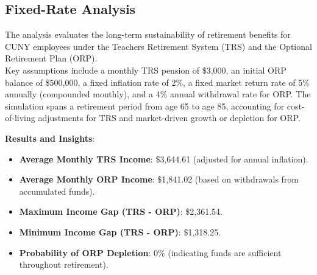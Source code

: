 \documentclass[
  letterpaper,
  DIV=11,
  numbers=noendperiod]{scrartcl}
\newenvironment{Shaded}{\begin{snugshade}}{\end{snugshade}}
\newcommand{\AttributeTok}[1]{\textcolor[rgb]{0.40,0.45,0.13}{#1}}
\newcommand{\CommentTok}[1]{\textcolor[rgb]{0.37,0.37,0.37}{#1}}
\newcommand{\DecValTok}[1]{\textcolor[rgb]{0.68,0.00,0.00}{#1}}
\newcommand{\FunctionTok}[1]{\textcolor[rgb]{0.28,0.35,0.67}{#1}}
\newcommand{\NormalTok}[1]{\textcolor[rgb]{0.00,0.23,0.31}{#1}}
\newcommand{\OtherTok}[1]{\textcolor[rgb]{0.00,0.23,0.31}{#1}}
\newcommand{\SpecialCharTok}[1]{\textcolor[rgb]{0.37,0.37,0.37}{#1}}
\begin{document}
\begin{Shaded}
\end{Shaded}

\subsection{Fixed-Rate Analysis}\label{fixed-rate-analysis}

The analysis evaluates the long-term sustainability of retirement
benefits for CUNY employees under the Teachers Retirement System (TRS)
and the Optional Retirement Plan (ORP).\\
Key assumptions include a monthly TRS pension of \$3,000, an initial ORP
balance of \$500,000, a fixed inflation rate of 2\%, a fixed market
return rate of 5\% annually (compounded monthly), and a 4\% annual
withdrawal rate for ORP. The simulation spans a retirement period from
age 65 to age 85, accounting for cost-of-living adjustments for TRS and
market-driven growth or depletion for ORP.

\textbf{Results and Insights}:

\begin{itemize}
\item
  \textbf{Average Monthly TRS Income}: \$3,644.61 (adjusted for annual
  inflation).
\item
  \textbf{Average Monthly ORP Income}: \$1,841.02 (based on withdrawals
  from accumulated funds).
\item
  \textbf{Maximum Income Gap (TRS - ORP)}: \$2,361.54.
\item
  \textbf{Minimum Income Gap (TRS - ORP)}: \$1,318.25.
\item
  \textbf{Probability of ORP Depletion}: 0\% (indicating funds are
  sufficient throughout retirement).
\end{itemize}
\end{document}
